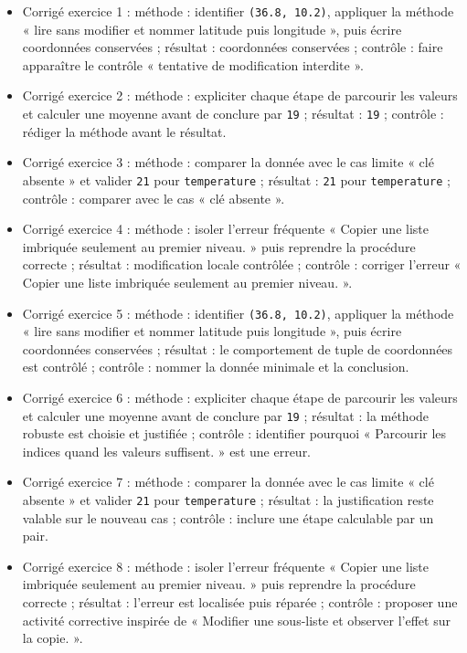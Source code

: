 \begin{itemize}
\tightlist
\item
  Corrigé exercice 1 : méthode : identifier \texttt{(36.8,\ 10.2)},
  appliquer la méthode « lire sans modifier et nommer latitude puis
  longitude », puis écrire coordonnées conservées ; résultat :
  coordonnées conservées ; contrôle : faire apparaître le contrôle «
  tentative de modification interdite ».
\item
  Corrigé exercice 2 : méthode : expliciter chaque étape de parcourir
  les valeurs et calculer une moyenne avant de conclure par \texttt{19}
  ; résultat : \texttt{19} ; contrôle : rédiger la méthode avant le
  résultat.
\item
  Corrigé exercice 3 : méthode : comparer la donnée avec le cas limite «
  clé absente » et valider \texttt{21} pour \texttt{temperature} ;
  résultat : \texttt{21} pour \texttt{temperature} ; contrôle : comparer
  avec le cas « clé absente ».
\item
  Corrigé exercice 4 : méthode : isoler l'erreur fréquente « Copier une
  liste imbriquée seulement au premier niveau. » puis reprendre la
  procédure correcte ; résultat : modification locale contrôlée ;
  contrôle : corriger l'erreur « Copier une liste imbriquée seulement au
  premier niveau. ».
\item
  Corrigé exercice 5 : méthode : identifier \texttt{(36.8,\ 10.2)},
  appliquer la méthode « lire sans modifier et nommer latitude puis
  longitude », puis écrire coordonnées conservées ; résultat : le
  comportement de tuple de coordonnées est contrôlé ; contrôle : nommer
  la donnée minimale et la conclusion.
\item
  Corrigé exercice 6 : méthode : expliciter chaque étape de parcourir
  les valeurs et calculer une moyenne avant de conclure par \texttt{19}
  ; résultat : la méthode robuste est choisie et justifiée ; contrôle :
  identifier pourquoi « Parcourir les indices quand les valeurs
  suffisent. » est une erreur.
\item
  Corrigé exercice 7 : méthode : comparer la donnée avec le cas limite «
  clé absente » et valider \texttt{21} pour \texttt{temperature} ;
  résultat : la justification reste valable sur le nouveau cas ;
  contrôle : inclure une étape calculable par un pair.
\item
  Corrigé exercice 8 : méthode : isoler l'erreur fréquente « Copier une
  liste imbriquée seulement au premier niveau. » puis reprendre la
  procédure correcte ; résultat : l'erreur est localisée puis réparée ;
  contrôle : proposer une activité corrective inspirée de « Modifier une
  sous-liste et observer l'effet sur la copie. ».
\end{itemize}

